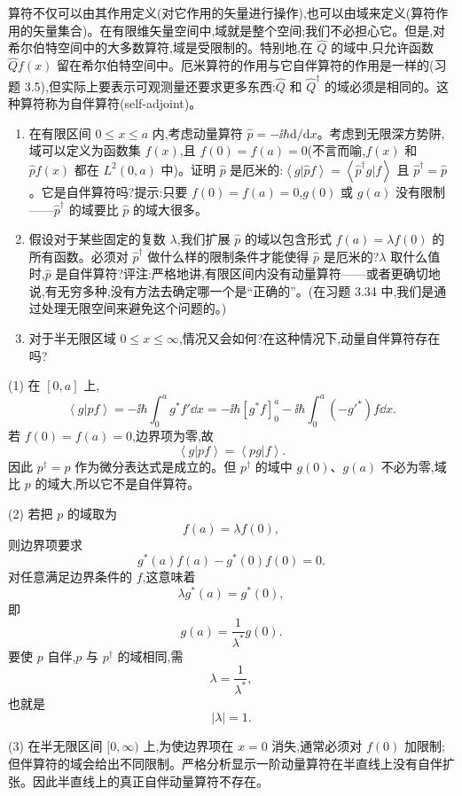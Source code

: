 \begin{question}
算符不仅可以由其作用定义(对它作用的矢量进行操作),也可以由域来定义(算符作用的矢量集合)。在有限维矢量空间中,域就是整个空间;我们不必担心它。但是,对希尔伯特空间中的大多数算符,域是受限制的。特别地,在 $\hat Q$ 的域中,只允许函数 $\hat Q f(x)$ 留在希尔伯特空间中。厄米算符的作用与它自伴算符的作用是一样的(习题 3.5),但实际上要表示可观测量还要求更多东西:$\hat Q$ 和 $\hat Q^\dagger$ 的域必须是相同的。这种算符称为自伴算符(self-adjoint)。
\begin{enumerate}
\item 在有限区间 $0\leq x\leq a$ 内,考虑动量算符 $\hat p=-\ii\hbar\mathrm d/\mathrm dx$。考虑到无限深方势阱,域可以定义为函数集 $f(x)$,且 $f(0)=f(a)=0$(不言而喻,$f(x)$ 和 $\hat p f(x)$ 都在 $L^2(0,a)$ 中)。证明 $\hat p$ 是厄米的:$\left\langle g|\hat p f \right\rangle=\left\langle \hat p^\dagger g|f \right\rangle$ 且 $\hat p^\dagger=\hat p$。它是自伴算符吗?提示:只要 $f(0)=f(a)=0$,$g(0)$ 或 $g(a)$ 没有限制——$\hat p^\dagger$ 的域要比 $\hat p$ 的域大很多。
\item 假设对于某些固定的复数 $\lambda$,我们扩展 $\hat p$ 的域以包含形式 $f(a)=\lambda f(0)$ 的所有函数。必须对 $\hat p^\dagger$ 做什么样的限制条件才能使得 $\hat p$ 是厄米的?$\lambda$ 取什么值时,$\hat p$ 是自伴算符?评注:严格地讲,有限区间内没有动量算符——或者更确切地说,有无穷多种,没有方法去确定哪一个是“正确的”。(在习题 3.34 中,我们是通过处理无限空间来避免这个问题的。)
\item 对于半无限区域 $0\leq x\leq\infty$,情况又会如何?在这种情况下,动量自伴算符存在吗?
\end{enumerate}
\end{question}
\begin{solution}
(1) 在 $[0,a]$ 上,
\[
\left\langle g|pf \right\rangle=-\ii\hbar\int_0^ag^*f'\dd x
=-\ii\hbar[g^*f]_0^a-\ii\hbar\int_0^a(-g'^*)f\dd x.
\]
若 $f(0)=f(a)=0$,边界项为零,故
\[
\left\langle g|pf \right\rangle=\left\langle pg|f \right\rangle.
\]
因此 $p^\dagger=p$ 作为微分表达式是成立的。但 $p^\dagger$ 的域中 $g(0)$、$g(a)$ 不必为零,域比 $p$ 的域大,所以它不是自伴算符。

(2) 若把 $p$ 的域取为
\[
f(a)=\lambda f(0),
\]
则边界项要求
\[
g^*(a)f(a)-g^*(0)f(0)=0.
\]
对任意满足边界条件的 $f$,这意味着
\[
\lambda g^*(a)=g^*(0),
\]
即
\[
\boxed{g(a)=\frac{1}{\lambda^*}g(0).}
\]
要使 $p$ 自伴,$p$ 与 $p^\dagger$ 的域相同,需
\[
\lambda=\frac1{\lambda^*},
\]
也就是
\[
\boxed{|\lambda|=1.}
\]

(3) 在半无限区间 $[0,\infty)$ 上,为使边界项在 $x=0$ 消失,通常必须对 $f(0)$ 加限制;但伴算符的域会给出不同限制。严格分析显示一阶动量算符在半直线上没有自伴扩张。因此半直线上的真正自伴动量算符不存在。
\end{solution}

